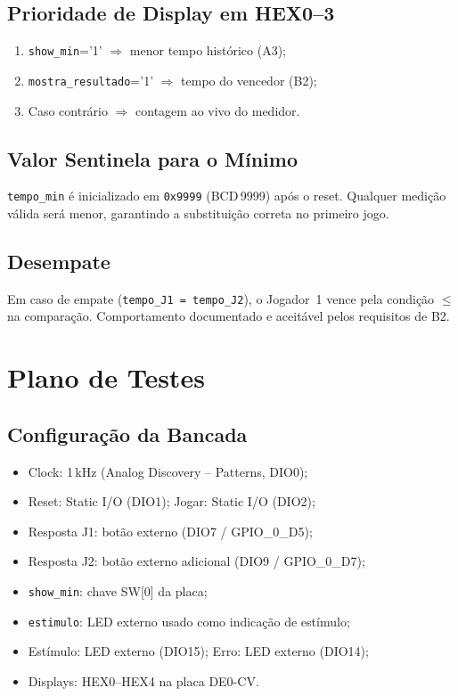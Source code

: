 \documentclass[12pt,a4paper]{article}
\begin{document}
\subsection{Prioridade de Display em HEX0--3}
\begin{enumerate}
  \item \texttt{show\_min}='1' $\Rightarrow$ menor tempo histórico (A3);
  \item \texttt{mostra\_resultado}='1' $\Rightarrow$ tempo do vencedor (B2);
  \item Caso contrário $\Rightarrow$ contagem ao vivo do medidor.
\end{enumerate}

\subsection{Valor Sentinela para o Mínimo}
\texttt{tempo\_min} é inicializado em \texttt{0x9999} (BCD\,9999) após o
reset. Qualquer medição válida será menor, garantindo a substituição correta
no primeiro jogo.

\subsection{Desempate}
Em caso de empate (\texttt{tempo\_J1 = tempo\_J2}), o Jogador~1 vence
pela condição \texttt{$\leq$} na comparação. Comportamento documentado e
aceitável pelos requisitos de B2.

\section{Plano de Testes}

\subsection{Configuração da Bancada}
\begin{itemize}
  \item Clock: 1\,kHz (Analog Discovery -- Patterns, DIO0);
  \item Reset: Static I/O (DIO1);  Jogar: Static I/O (DIO2);
  \item Resposta J1: botão externo (DIO7 / GPIO\_0\_D5);
  \item Resposta J2: botão externo adicional (DIO9 / GPIO\_0\_D7);
  \item \texttt{show\_min}: chave SW[0] da placa;
  \item \texttt{estimulo}: LED externo usado como indicação de estímulo;
  \item Estímulo: LED externo (DIO15);  Erro: LED externo (DIO14);
  \item Displays: HEX0--HEX4 na placa DE0-CV\@.
\end{itemize}
\end{document}
